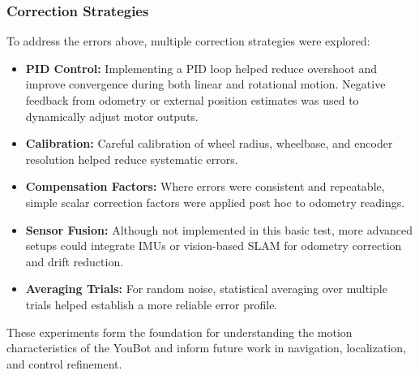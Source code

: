\documentclass[a4paper, 12pt]{article}
\begin{document}
    \subsubsection*{Correction Strategies}

    To address the errors above, multiple correction strategies were explored:

    \begin{itemize}
        \item \textbf{PID Control:} Implementing a PID loop helped reduce overshoot and improve convergence during both linear and rotational motion. Negative feedback from odometry or external position estimates was used to dynamically adjust motor outputs.

        \item \textbf{Calibration:} Careful calibration of wheel radius, wheelbase, and encoder resolution helped reduce systematic errors.

        \item \textbf{Compensation Factors:} Where errors were consistent and repeatable, simple scalar correction factors were applied post hoc to odometry readings.

        \item \textbf{Sensor Fusion:} Although not implemented in this basic test, more advanced setups could integrate IMUs or vision-based SLAM for odometry correction and drift reduction.

        \item \textbf{Averaging Trials:} For random noise, statistical averaging over multiple trials helped establish a more reliable error profile.
    \end{itemize}

    These experiments form the foundation for understanding the motion characteristics of the YouBot and inform future work in navigation, localization, and control refinement.
    \pagebreak
\end{document}
